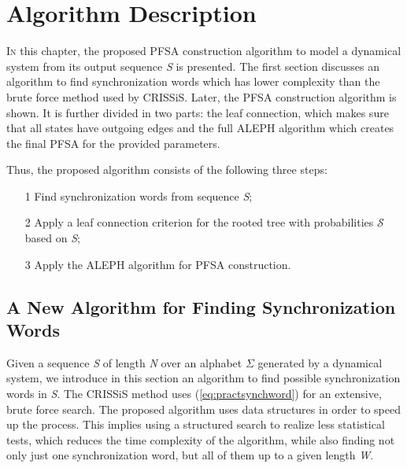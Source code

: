 \chapter{Algorithm Description}\label{cap:3}


{\lettrine[loversize=0.25,findent=0.2em,nindent=0em]{I}{n} this chapter, the proposed PFSA construction algorithm to model a dynamical system from its output sequence \textit{S} is presented. The first section discusses an algorithm to find synchronization words which has lower complexity than the brute force method used by CRISSiS. Later, the PFSA construction algorithm is shown. It is further divided in two parts: the leaf connection, which makes sure that all states have outgoing edges and the full ALEPH algorithm which creates the final PFSA for the provided parameters. 

Thus, the proposed algorithm consists of the following three steps: 


\begin{enumerate}
\item[1] Find synchronization words from sequence \textit{S};
\item[2] Apply a leaf connection criterion for the rooted tree with probabilities $\mathcal{S}$ based on \textit{S};
\item[3] Apply the ALEPH algorithm for PFSA construction.
\end{enumerate}

\section{A New Algorithm for Finding Synchronization Words\label{sec:findsynch}}

Given a sequence \textit{S} of length \textit{N} over an alphabet $\Sigma$ generated by a dynamical system, we introduce in this section an algorithm to find possible synchronization words in \textit{S}. The CRISSiS method uses (\ref{eq:practsynchword}) for an extensive, brute force search.  The proposed algorithm uses data structures in order to speed up the process. This implies using a structured search to realize less statistical tests, which reduces the time complexity of the algorithm, while also finding not only just one synchronization word, but all of them up to a given length \textit{W}.

}
